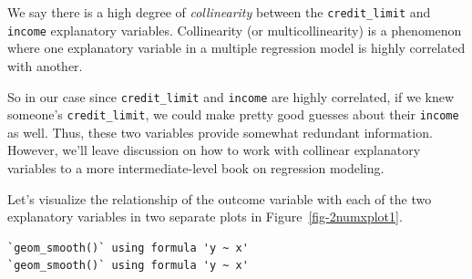 \documentclass[
  letterpaper,
  DIV=11,
  numbers=noendperiod]{scrreprt}
\newenvironment{Shaded}{\begin{snugshade}}{\end{snugshade}}
\newcommand{\AttributeTok}[1]{\textcolor[rgb]{0.40,0.45,0.13}{#1}}
\newcommand{\ConstantTok}[1]{\textcolor[rgb]{0.56,0.35,0.01}{#1}}
\newcommand{\FunctionTok}[1]{\textcolor[rgb]{0.28,0.35,0.67}{#1}}
\newcommand{\NormalTok}[1]{\textcolor[rgb]{0.00,0.23,0.31}{#1}}
\newcommand{\SpecialCharTok}[1]{\textcolor[rgb]{0.37,0.37,0.37}{#1}}
\newcommand{\StringTok}[1]{\textcolor[rgb]{0.13,0.47,0.30}{#1}}
\theoremstyle{definition}
\theoremstyle{remark}
\begin{document}
We say there is a high degree of \emph{collinearity}
between the \texttt{credit\_limit} and \texttt{income} explanatory
variables. Collinearity (or multicollinearity) is a phenomenon where one
explanatory variable in a multiple regression model is highly correlated
with another.

So in our case since \texttt{credit\_limit} and \texttt{income} are
highly correlated, if we knew someone's \texttt{credit\_limit}, we could
make pretty good guesses about their \texttt{income} as well. Thus,
these two variables provide somewhat redundant information. However,
we'll leave discussion on how to work with collinear explanatory
variables to a more intermediate-level book on regression modeling.

Let's visualize the relationship of the outcome variable with each of
the two explanatory variables in two separate plots in
Figure~\ref{fig-2numxplot1}.

\begin{Shaded}
\end{Shaded}

\begin{verbatim}
`geom_smooth()` using formula 'y ~ x'
`geom_smooth()` using formula 'y ~ x'
\end{verbatim}
\end{document}
